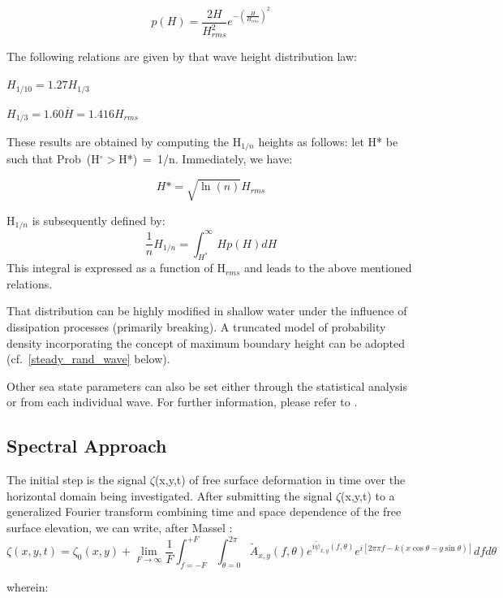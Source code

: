 \begin{equation}
  p(H) = \frac{2H}{H_{rms}^{2}}e^{-\left(\frac{H}{H_{rms}}\right)^{2}}
\end{equation}

The following relations are given by that wave height distribution law:

$H_{1/10} = 1.27 H_{1/3}$

$H_{1/3} = 1.60 \overline{H} = 1.416 H_{rms}$


These results are obtained by computing the H${}_{1/n}$ heights as follows: let H*
be such that Prob~(H${}^\circ >$H*)~=~1/n. Immediately, we
have:

$$H* = \sqrt{\ln(n)}H_{rms} $$

H${}_{1/n}$ is subsequently defined by:
\[\frac{1}{n}H_{1/n}=\int^{\infty }_{H^*}{Hp\left(H\right)dH}\]
This integral is expressed as a function of H${}_{rms}$ and leads to the above
mentioned relations.

That distribution can be highly modified in shallow water under the influence
of dissipation processes (primarily breaking). A truncated model of probability
density incorporating the concept of maximum boundary height can be adopted
(cf.~\ref{steady_rand_wave} below).

Other sea state parameters can also be set either through the statistical
analysis or from each individual wave. For further information, please refer to
\cite{SeaState}.


\subsection{Spectral Approach}

The initial step is the signal $\zeta$(x,y,t) of free surface deformation in
time over the horizontal domain being investigated. After submitting the signal
$\zeta$(x,y,t) to a generalized Fourier transform combining time and space
dependence of the free surface elevation, we can write, after Massel
\cite{Massel1996}:
\begin{equation}
  \zeta(x,y,t) = \zeta_{0}(x,y) + \lim_{F\rightarrow\infty}\frac{1}{F}\int_{f=-F}^{+F}\int_{\theta=0}^{2\pi}
         \tilde{A}_{x,y}(f,\theta)
         e^{i\tilde{\psi}_{x,y}(f,\theta)}
         e^{i[2\pi\pi{f}-k(x \cos \theta - y \sin \theta )]}d{f}d{\theta}
\end{equation}

wherein:

